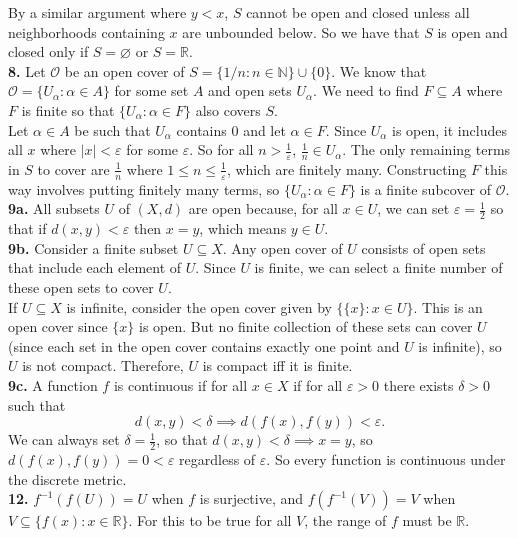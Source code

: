 \documentclass{article}
\newcommand{\R}{\mathbb{R}}
\newcommand{\N}{\mathbb{N}}
\newcommand{\eps}{\varepsilon}
\newcommand{\OO}{\mathcal{O}}
\begin{document}
By a similar argument where $y < x$, $S$ cannot be open and closed unless all neighborhoods containing $x$ are unbounded below. So we have that $S$ is open and closed only if $S = \varnothing$ or $S = \R$. \\

\textbf{8.} Let $\OO$ be an open cover of $S = \{1/n: n \in \N\} \cup \{0\}$. We know that $\OO = \{U_\alpha: \alpha \in A\}$ for some set $A$ and open sets $U_\alpha$. We need to find $F \subseteq A$ where $F$ is finite so that $\{U_\alpha: \alpha \in F\}$ also covers $S$. \\

Let $\alpha \in A$ be such that $U_\alpha$ contains $0$ and let $\alpha \in F$. Since $U_\alpha$ is open, it includes all $x$ where $|x| < \eps$ for some $\eps$. So for all $n > \frac{1}{\eps}$, $\frac{1}{n} \in U_\alpha$. The only remaining terms in $S$ to cover are $\frac{1}{n}$ where $1 \le n \le \frac{1}{\eps}$, which are finitely many. Constructing $F$ this way involves putting finitely many terms, so $\{U_\alpha: \alpha \in F\}$ is a finite subcover of $\OO$. \\

\textbf{9a.} All subsets $U$ of $(X, d)$ are open because, for all $x \in U$, we can set $\eps = \frac{1}{2}$ so that if $d(x, y) < \eps$ then $x = y$, which means $y \in U$. \\

\textbf{9b.} Consider a finite subset $U \subseteq X$. Any open cover of $U$ consists of open sets that include each element of $U$. Since $U$ is finite, we can select a finite number of these open sets to cover $U$. \\

If $U \subseteq X$ is infinite, consider the open cover given by $\{\{x\}: x \in U\}$. This is an open cover since $\{x\}$ is open. But no finite collection of these sets can cover $U$ (since each set in the open cover contains exactly one point and $U$ is infinite), so $U$ is not compact. Therefore, $U$ is compact iff it is finite. \\

\textbf{9c.} A function $f$ is continuous if for all $x \in X$ if for all $\eps > 0$ there exists $\delta > 0$ such that
$$d(x, y) < \delta \implies d(f(x), f(y)) < \eps.$$
We can always set $\delta = \frac{1}{2}$, so that $d(x, y) < \delta \implies x = y$, so $d(f(x), f(y)) = 0 < \eps$ regardless of $\eps$. So every function is continuous under the discrete metric. \\

\textbf{12.} $f^{-1}(f(U))= U$ when $f$ is surjective, and $f(f^{-1}(V)) = V$ when $V \subseteq \{f(x): x \in \R\}$. For this to be true for all $V$, the range of $f$ must be $\R$.
\end{document}

